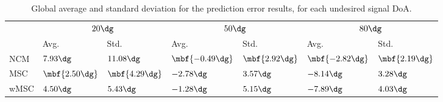 \begin{table}[t]
	\centering
	\renewcommand{\arraystretch}{1.4}
	\begin{tabular}{l l l l l l l}
		& \multicolumn{2}{c}{$20\dg$} & \multicolumn{2}{c}{$50\dg$} & \multicolumn{2}{c}{$80\dg$} \\
		\hhline{=======}
		& Avg. & Std. & Avg. & Std. & Avg. & Std. \\
		\hline
		NCM    & $7.93\dg$         & $11.08\dg$        & $\mbf{-0.49\dg}$  & $\mbf{2.92\dg}$   & $\mbf{-2.82\dg}$  & $\mbf{2.19\dg}$  \\
		MSC    & $\mbf{2.50\dg}$   & $\mbf{4.29\dg}$   & $-2.78\dg$        & $3.57\dg$         & $-8.14\dg$        & $3.28\dg$        \\
		wMSC   & $4.50\dg$         & $5.43\dg$         & $-1.28\dg$        & $5.15\dg$         & $-7.89\dg$        & $4.03\dg$
	\end{tabular}
	\caption{Global average and standard deviation for the prediction error results, for each undesired signal DoA.}
	\label{tab:sec3:error__each_DOA__total}
\end{table}